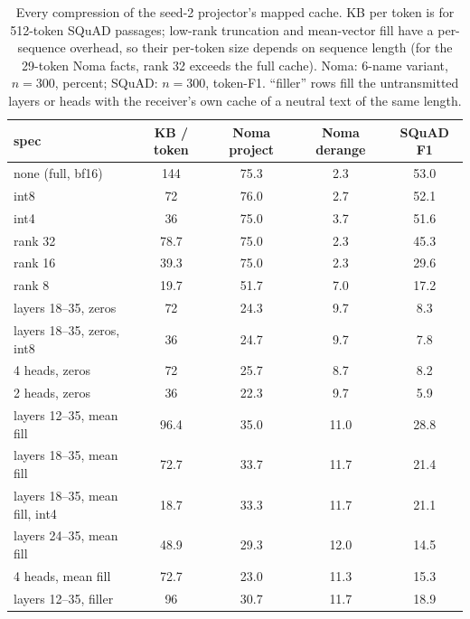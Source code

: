 \documentclass[11pt,a4paper]{report}
\begin{document}
\begin{table}[h]
\caption{Every compression of the seed-2 projector's mapped cache. KB per token is for 512-token SQuAD passages; low-rank truncation and mean-vector fill have a per-sequence overhead, so their per-token size depends on sequence length (for the 29-token Noma facts, rank 32 exceeds the full cache). Noma: 6-name variant, $n = 300$, percent; SQuAD: $n = 300$, token-F1. ``filler'' rows fill the untransmitted layers or heads with the receiver's own cache of a neutral text of the same length.}
\label{tab:compress}
\vskip 0.1in
\begin{center}
\begin{footnotesize}
\begin{tabular}{lcccc}
\toprule
spec & KB / token & Noma project & Noma derange & SQuAD F1 \\
\midrule
none (full, bf16)                       & 144  & 75.3 & 2.3  & 53.0 \\
int8                                    & 72   & 76.0 & 2.7  & 52.1 \\
int4                                    & 36   & 75.0 & 3.7  & 51.6 \\
rank 32                                 & 78.7 & 75.0 & 2.3  & 45.3 \\
rank 16                                 & 39.3 & 75.0 & 2.3  & 29.6 \\
rank 8                                  & 19.7 & 51.7 & 7.0  & 17.2 \\
layers 18--35, zeros                    & 72   & 24.3 & 9.7  & 8.3 \\
layers 18--35, zeros, int8              & 36   & 24.7 & 9.7  & 7.8 \\
4 heads, zeros                          & 72   & 25.7 & 8.7  & 8.2 \\
2 heads, zeros                          & 36   & 22.3 & 9.7  & 5.9 \\
layers 12--35, mean fill                & 96.4 & 35.0 & 11.0 & 28.8 \\
layers 18--35, mean fill                & 72.7 & 33.7 & 11.7 & 21.4 \\
layers 18--35, mean fill, int4          & 18.7 & 33.3 & 11.7 & 21.1 \\
layers 24--35, mean fill                & 48.9 & 29.3 & 12.0 & 14.5 \\
4 heads, mean fill                      & 72.7 & 23.0 & 11.3 & 15.3 \\
layers 12--35, filler                   & 96   & 30.7 & 11.7 & 18.9 \\

\end{tabular}
\end{footnotesize}
\end{center}
\end{table}
\end{document}

